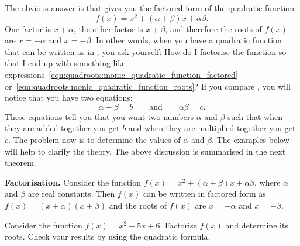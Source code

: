 \documentclass[a4paper,oneside,12pt]{article}
\begin{document}
The obvious answer is that
 gives you
the factored form of the quadratic function
\begin{equation}
\label{eqn:quadroots:monic_quadratic_function_roots}
f(x)
=
x^2 + (\alpha + \beta)x + \alpha\beta.
\end{equation}
One factor is $x + \alpha$, the other factor is $x + \beta$, and
therefore the roots of $f(x)$ are $x = -\alpha$ and $x = -\beta$.  In
other words, when you have a quadratic function that can be written as
in , you ask
yourself: How do I factorise the function so that I end up with
something like
expressions~\eqref{eqn:quadroots:monic_quadratic_function_factored}
or~\eqref{eqn:quadroots:monic_quadratic_function_roots}?  If you
compare
,
you will notice that you have two equations:
\begin{equation}
\label{eqn:quadroots:monic_quadratic_function_factors_sum_product}
\alpha + \beta
=
b
\qquad
\text{and}
\qquad
\alpha\beta
=
c.
\end{equation}
These equations tell you that you want two numbers $\alpha$ and
$\beta$ such that when they are added together you get $b$ and when
they are multiplied together you get $c$.  The problem now is to
determine the values of $\alpha$ and $\beta$.  The examples below will
help to clarify the theory.  The above discussion is summarised in the
next theorem.

\begin{theorem}
\textbf{Factorisation.}
Consider the function $f(x) = x^2 + (\alpha + \beta)x + \alpha\beta$,
where $\alpha$ and $\beta$ are real constants.  Then $f(x)$ can be
written in factored form as $f(x) = (x + \alpha) (x + \beta)$ and the
roots of $f(x)$ are $x = -\alpha$ and $x = -\beta$.
\end{theorem}

\begin{example}
\label{eg:quadroots:factorise_monic_a1_b2_c6}
Consider the function $f(x) = x^2 + 5x + 6$.  Factorise $f(x)$ and
determine its roots.  Check your results by using the quadratic
formula.
\end{example}
\end{document}
